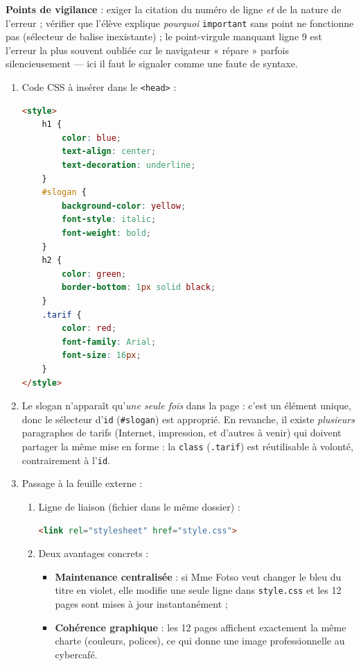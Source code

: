 \documentclass[11pt]{article}
\newcommand{\cle}[1]{{\popxbold\color{popdark}#1}}
\begin{document}
\begin{corrige}
\textbf{Points de vigilance} : exiger la citation du numéro de ligne \emph{et} de la nature de l'erreur ; vérifier que l'élève explique \emph{pourquoi} \texttt{important} sans point ne fonctionne pas (sélecteur de balise inexistante) ; le point-virgule manquant ligne 9 est l'erreur la plus souvent oubliée car le navigateur « répare » parfois silencieusement — ici il faut le signaler comme une faute de syntaxe.
\end{corrige}

\begin{corrige}
\begin{enumerate}
  \item Code \cle{CSS} à insérer dans le \texttt{<head>} :
\begin{lstlisting}[language=HTML]
<style>
    h1 {
        color: blue;
        text-align: center;
        text-decoration: underline;
    }
    #slogan {
        background-color: yellow;
        font-style: italic;
        font-weight: bold;
    }
    h2 {
        color: green;
        border-bottom: 1px solid black;
    }
    .tarif {
        color: red;
        font-family: Arial;
        font-size: 16px;
    }
</style>
\end{lstlisting}
  \item Le slogan n'apparaît qu'\emph{une seule fois} dans la page : c'est un élément unique, donc le sélecteur d'\texttt{id} (\texttt{\#slogan}) est approprié. En revanche, il existe \emph{plusieurs} paragraphes de tarifs (Internet, impression, et d'autres à venir) qui doivent partager la même mise en forme : la \texttt{class} (\texttt{.tarif}) est réutilisable à volonté, contrairement à l'\texttt{id}.
  \item Passage à la feuille externe :
  \begin{enumerate}
    \item Ligne de liaison (fichier dans le même dossier) :
\begin{lstlisting}[language=HTML]
<link rel="stylesheet" href="style.css">
\end{lstlisting}
    \item Deux avantages concrets :
    \begin{itemize}
      \item \textbf{Maintenance centralisée} : si Mme Fotso veut changer le bleu du titre en violet, elle modifie une seule ligne dans \texttt{style.css} et les 12 pages sont mises à jour instantanément ;
      \item \textbf{Cohérence graphique} : les 12 pages affichent exactement la même charte (couleurs, polices), ce qui donne une image professionnelle au cybercafé.

\end{itemize}
\end{enumerate}
\end{enumerate}
\end{corrige}
\end{document}
